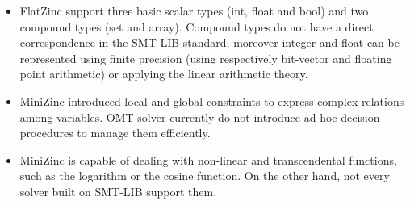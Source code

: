 \begin{itemize}
    \item FlatZinc support three basic scalar types (int, float and bool) and two compound types (set and array). Compound types do not have a direct correspondence in the SMT-LIB standard; moreover integer and float can be represented using finite precision (using respectively bit-vector and floating point arithmetic) or applying the linear arithmetic theory.
    \item MiniZinc introduced local and global constraints to express complex relations among variables. OMT solver currently do not introduce ad hoc decision procedures to manage them efficiently.
    \item MiniZinc is capable of dealing with non-linear and transcendental functions, such as the logarithm or the cosine function. On the other hand, not every solver built on SMT-LIB support them.
\end{itemize}

\pagebreak

